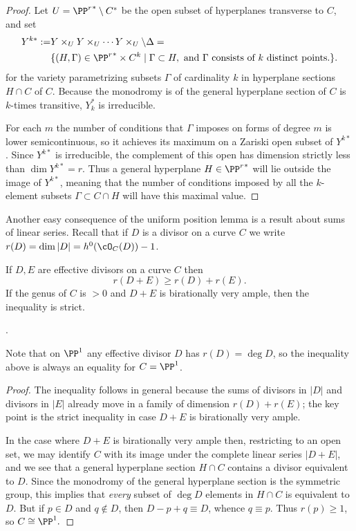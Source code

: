 \begin{proof} Let $U = {\PP^r}^* \setminus C^*$ be the open subset of hyperplanes transverse to $C$, and set
\begin{align*}
 Y^{k*} :=&Y\times_U Y\times_U \cdots Y\times_U \setminus \Delta  =\\
                                                 & \{ (H, \Gamma) \in {\PP^r}^* \times C^k \mid \Gamma \subset H, \hbox{ and $\Gamma$ consists of $k$ distinct points.}\}.
\end{align*}
for the variety parametrizing subsets $\Gamma$ of cardinality $k$ in hyperplane sections $H \cap C$ of $C$. Because the monodromy is of the general hyperplane section of $C$ is
$k$-times transitive, $Y_k^*$ is irreducible.

For each $m$ the number of conditions that $\Gamma$ imposes on forms of degree $m$ is lower semicontinuous, so it achieves its maximum on a Zariski open subset of $Y^{k*}$. Since $Y^{k*}$ is irreducible, the complement of this open has dimension strictly less than $\dim Y^{k*} = r$. Thus a general hyperplane $H \in {\PP^r}^*$ will lie outside the image of $Y^{k*}$, meaning that the number of conditions imposed by all the $k$-element subsets $\Gamma \subset C \cap H$ will have this maximal value.
\end{proof}

Another easy consequence of the uniform position lemma is a result about sums of linear series.
Recall that if $D$ is a divisor on a curve $C$ we write $r(D) = \dim |D| = h^0(\cO_C(D))-1$.

\begin{corollary}\label{Clifford equality plus}
If $D,E$ are effective divisors on a curve $C$ then
$$
r(D+E) \geq r(D)+r(E).
$$
If the genus of $C$ is $>0$ and $D+E$ is birationally very ample, then the inequality is strict.
\end{corollary}.

Note that on $\PP^1$ any effective divisor $D$ has $r(D) = \deg D$, so the inequality above is
always an equality for $C = \PP^1$.

\begin{proof}
 The inequality follows in general because the sums of divisors in $|D|$ and divisors in $|E|$ already move in 
 a family of dimension $r(D)+r(E)$; the key point is the strict inequality in case $D+E$ is birationally very ample.
 
In the case where $D+E$ is birationally very ample then, restricting to an open set,
we may identify $C$ with its image under the complete linear series $|D+E|$, and we see that a general hyperplane section $H\cap C$ contains a divisor equivalent to $D$. Since the monodromy of the general hyperplane section
is the symmetric group, this implies that \emph{every} subset of $\deg D$ elements in $H\cap C$ is
equivalent to $D$. But if $p\in D$ and $q\notin D$, then $D-p+q \equiv D$, whence $q\equiv p$. Thus
$r(p)\geq 1$, so $C\cong \PP^1.$
\end{proof}

